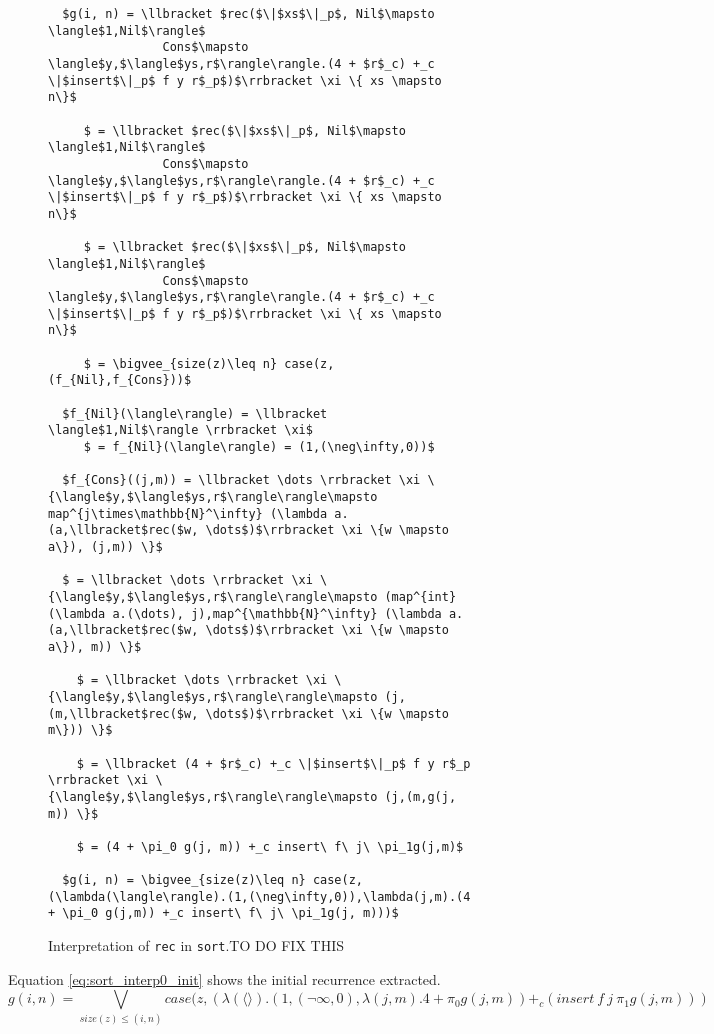 \documentclass[12pt,letterpaper]{article}
\newcommand{\T}[1]{\texttt{#1}}
\begin{document}
\begin{figure}[H]
  \caption{Interpretation of \T{rec} in \T{sort}.TO DO FIX THIS}
  \label{fig:sort_rec_interp}
  \begin{lstlisting}
  $g(i, n) = \llbracket $rec($\|$xs$\|_p$, Nil$\mapsto \langle$1,Nil$\rangle$
                Cons$\mapsto \langle$y,$\langle$ys,r$\rangle\rangle.(4 + $r$_c) +_c \|$insert$\|_p$ f y r$_p$)$\rrbracket \xi \{ xs \mapsto n\}$

     $ = \llbracket $rec($\|$xs$\|_p$, Nil$\mapsto \langle$1,Nil$\rangle$
                Cons$\mapsto \langle$y,$\langle$ys,r$\rangle\rangle.(4 + $r$_c) +_c \|$insert$\|_p$ f y r$_p$)$\rrbracket \xi \{ xs \mapsto n\}$

     $ = \llbracket $rec($\|$xs$\|_p$, Nil$\mapsto \langle$1,Nil$\rangle$
                Cons$\mapsto \langle$y,$\langle$ys,r$\rangle\rangle.(4 + $r$_c) +_c \|$insert$\|_p$ f y r$_p$)$\rrbracket \xi \{ xs \mapsto n\}$

     $ = \bigvee_{size(z)\leq n} case(z,(f_{Nil},f_{Cons}))$

  $f_{Nil}(\langle\rangle) = \llbracket \langle$1,Nil$\rangle \rrbracket \xi$
     $ = f_{Nil}(\langle\rangle) = (1,(\neg\infty,0))$

  $f_{Cons}((j,m)) = \llbracket \dots \rrbracket \xi \{\langle$y,$\langle$ys,r$\rangle\rangle\mapsto map^{j\times\mathbb{N}^\infty} (\lambda a.(a,\llbracket$rec($w, \dots$)$\rrbracket \xi \{w \mapsto a\}), (j,m)) \}$

  $ = \llbracket \dots \rrbracket \xi \{\langle$y,$\langle$ys,r$\rangle\rangle\mapsto (map^{int} (\lambda a.(\dots), j),map^{\mathbb{N}^\infty} (\lambda a.(a,\llbracket$rec($w, \dots$)$\rrbracket \xi \{w \mapsto a\}), m)) \}$

    $ = \llbracket \dots \rrbracket \xi \{\langle$y,$\langle$ys,r$\rangle\rangle\mapsto (j,(m,\llbracket$rec($w, \dots$)$\rrbracket \xi \{w \mapsto m\})) \}$

    $ = \llbracket (4 + $r$_c) +_c \|$insert$\|_p$ f y r$_p \rrbracket \xi \{\langle$y,$\langle$ys,r$\rangle\rangle\mapsto (j,(m,g(j, m)) \}$

    $ = (4 + \pi_0 g(j, m)) +_c insert\ f\ j\ \pi_1g(j,m)$

  $g(i, n) = \bigvee_{size(z)\leq n} case(z,(\lambda(\langle\rangle).(1,(\neg\infty,0)),\lambda(j,m).(4 + \pi_0 g(j,m)) +_c insert\ f\ j\ \pi_1g(j, m)))$
  \end{lstlisting}
\end{figure}


Equation \ref{eq:sort_interp0_init} shows the initial recurrence extracted.
\begin{equation}
  \label{eq:sort_interp0_init}
  g(i,n) = \bigvee_{size(z)\leq (i,n)} case(z,(\lambda(\langle\rangle).(1,(\neg\infty,0),\lambda(j,m).4 + \pi_0 g(j,m)) +_c(insert\ f\ j\ \pi_1g(j, m)))
\end{equation}
\end{document}
